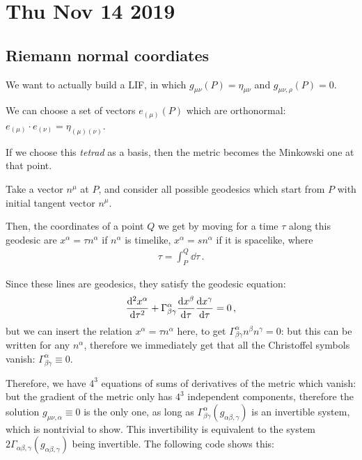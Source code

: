 \documentclass[main.tex]{subfiles}
\begin{document}
\section*{Thu Nov 14 2019}

\subsection{Riemann normal coordiates}

We want to actually build a LIF, in which \(g_{\mu \nu } (P ) = \eta_{\mu \nu }\) and \(g_{\mu \nu , \rho } (P)= 0\).

We can choose a set of vectors \(e_{(\mu )} (P)\) which are orthonormal: \(e_{(\mu )} \cdot e_{(\nu )} = \eta_{(\mu )(\nu )}\). 

If we choose this \emph{tetrad} as a basis, then the metric becomes the Minkowski one at that point.

Take a vector \(n^{\mu }\) at \(P\), and consider all possible geodesics which start from \(P\) with initial tangent vector \(n^{\mu }\).

Then, the coordinates of a point \(Q\) we get by moving for a time \(\tau \) along this geodesic are \(x^{\alpha } = \tau n^{\alpha }\) if \(n^{\alpha }\) is timelike, \(x^{\alpha } = s n^{\alpha }\) if it is spacelike, where 
%
\begin{align}
  \tau = \int _{P}^{Q} \dd{\tau } 
\,.
\end{align}

Since these lines are geodesics, they satisfy the geodesic equation: 
%
\begin{align}
  \dv[2]{x^{\alpha }}{\tau } + \Gamma^{\alpha }_{\beta \gamma } \dv{x^{\beta }}{\tau } \dv{x^{\gamma }}{\tau } = 0
\,,
\end{align}
%
but we can insert the relation \(x^{\alpha } = \tau n^{\alpha }\) here, to get \(\Gamma^{\alpha }_{\beta \gamma } n^{\beta } n^{\gamma }=0\): but this can be written for any \(n^{\alpha }\), therefore we immediately get that all the Christoffel symbols vanish: \(\Gamma^{ \alpha }_{\beta \gamma } \equiv 0\). 

Therefore, we have \(4^{3}\) equations of sums of derivatives of the metric which vanish: but the gradient of the metric only has \(4^{3}\) independent components, therefore the solution \(g_{\mu \nu , \alpha } \equiv 0\) is the only one, as long as \(\Gamma^{\alpha }_{\beta \gamma } (g_{\alpha \beta , \gamma })\) is an invertible system, which is nontrivial to show.
This invertibility is equivalent to the system \(2\Gamma_{\alpha \beta , \gamma } (g_{\alpha \beta , \gamma })\) being invertible. 
The following code shows this: 
\end{document}
